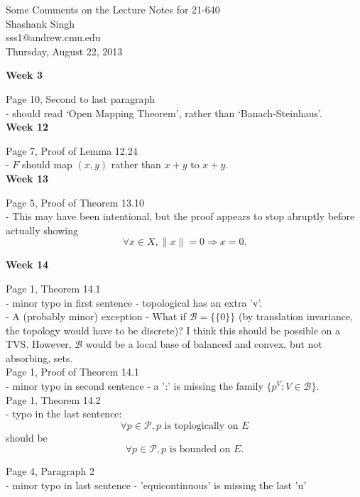 \documentclass[11pt]{article}
\makeatletter
\newcommand{\myname}{Shashank Singh}
\newcommand{\myandrew}{sss1@andrew.cmu.edu}
\newcommand{\mydate}{Thursday, August 22, 2013}
\renewcommand{\P}{\mathcal{P}}                      %
\newcommand{\B}{\mathcal{B}}                        %
\makeatother
\begin{document}
\thispagestyle{plain}

\begin{center}
{\Large Some Comments on the Lecture Notes for 21-640} \\
\myname \\
\myandrew \\
\mydate
\end{center}

{\bf Week 3}

Page 10, Second to last paragraph   \\
    - should read `Open Mapping Theorem', rather than `Banach-Steinhaus'.   \\

{\bf Week 12}

Page 7, Proof of Lemma 12.24       \\
    - $F$ should map $(x,y)$ rather than $x + y$ to $x + y$.                \\

{\bf Week 13}

Page 5, Proof of Theorem 13.10     \\
    - This may have been intentional, but the proof appears to stop abruptly
      before actually showing
        \[\forall x \in X, \|x\| = 0 \Rightarrow x = 0.\]

{\bf Week 14}

Page 1, Theorem 14.1               \\
    - minor typo in first sentence - topological has an extra 'v'.  \\
    - A (probably minor) exception - What if $\B = \{\{0\}\}$
    (by translation invariance, the topology would have to be
    discrete)? I think this should be possible on a TVS. However,
    $\B$ would be a local base of balanced and convex, but not
    absorbing, sets.    \\

Page 1, Proof of Theorem 14.1               \\
    - minor typo in second sentence - a ':' is missing the family
    $\{p^V : V \in \B\}$.        \\

Page 1, Theorem 14.2               \\
    - typo in the last sentence:
        \[\forall p \in \P, p \mbox{ is toplogically on } E\]
should be
        \[\forall p \in \P, p \mbox{ is bounded on } E.\]

Page 4, Paragraph 2 \\
    - minor typo in last sentence - 'equicontinuous' is missing the last 'u'\\
\end{document}
